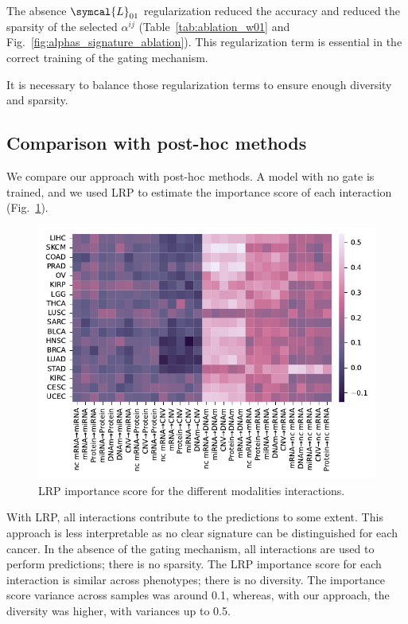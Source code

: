 \documentclass[../main.tex]{subfiles}
\begin{document}
     The absence \(\symcal{L}_{01}\) regularization reduced the accuracy and reduced the sparsity of the selected \(\alpha^{ij}\) (Table~\ref{tab:ablation_w01} and Fig.~\ref{fig:alphas_signature_ablation}).
     This regularization term is essential in the correct training of the gating mechanism.

     It is necessary to balance those regularization terms to ensure enough diversity and sparsity.

 \subsection{Comparison with post-hoc methods}

     We compare our approach with post-hoc methods.
     A model with no gate is trained, and we used LRP to estimate the importance score of each interaction (Fig.~\ref{fig:signature_LRP}).

     \begin{figure}[htbp]
         \centering
         \includegraphics[scale=0.75]{signature_alphas_LRP.pdf}
         \caption{LRP importance score for the different modalities interactions.}
         \label{fig:signature_LRP}
     \end{figure}

     With LRP, all interactions contribute to the predictions to some extent.
     This approach is less interpretable as no clear signature can be distinguished for each cancer.
     In the absence of the gating mechanism, all interactions are used to perform predictions; there is no sparsity.
     The LRP importance score for each interaction is similar across phenotypes; there is no diversity.
     The importance score variance across samples was around 0.1, whereas, with our approach, the diversity was higher, with variances up to 0.5.
\end{document}

